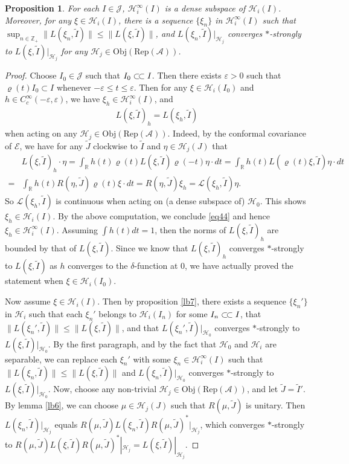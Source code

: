 \documentclass[11pt,b5paper,notitlepage]{article}
\theoremstyle{definition}
\theoremstyle{plain}
\newtheorem{pp}[df]{Proposition}
\newcommand{\mc}{\mathcal}
\newcommand{\wtd}{\widetilde}
\newcommand{\scr}{\mathscr}
\newcommand{\RepA}{\mathrm{Rep}(\mc A)}
\newcommand{\mbb}{\mathbb}
\newcommand{\Obj}{\mathrm{Obj}}
\numberwithin{equation}{subsection}
\begin{document}
\begin{pp}\label{lb8}
For each $I\in\mc J$, $\mc H_i^\infty(I)$ is a dense subspace of $\mc H_i(I)$. Moreover, for any $\xi\in\mc H_i(I)$, there is a sequence $\{\xi_n\}$ in $\mc H_i^\infty(I)$ such that $\sup_{n\in\mbb Z_+}\big\lVert  L(\xi_n,\wtd I) \big\lVert\leq\big\lVert  L(\xi,\wtd I) \big\lVert$,  and $L(\xi_n,\wtd I)|_{\mc H_j}$ converges $*$-strongly to $L(\xi,\wtd I)|_{\mc H_j}$ for any $\mc H_j\in\Obj(\RepA)$.
\end{pp}

\begin{proof}
Choose  $I_0\in\mc J$ such that $I_0\subset\joinrel\subset I$. Then there exists $\varepsilon>0$ such that $\varrho(t)I_0\subset I$ whenever $-\varepsilon\leq t\leq \varepsilon$. Then for any $\xi\in\mc H_i(I_0)$ and $h\in C_c^\infty(-\varepsilon,\varepsilon)$,  we have $\xi_h\in\mc H_i^\infty(I)$, and
\begin{align}
L(\xi,\wtd I)_h=L(\xi_h,\wtd I)\label{eq44}
\end{align}
when acting on any $\mc H_j\in\Obj(\RepA)$. Indeed, by the conformal covariance of $\scr E$, we have for any $\wtd J$ clockwise to $\wtd I$ and $\eta\in\mc H_j(J)$ that
\begin{align*}
&L(\xi,\wtd I)_h\cdot \eta=\int_{\mbb R}h(t)\varrho(t)L(\xi,\wtd I)\varrho(-t)\eta\cdot dt=\int_{\mbb R}h(t)L(\varrho(t)\xi,\wtd I)\eta\cdot dt\\
=&\int_{\mbb R}h(t)R(\eta,\wtd J)\varrho(t)\xi\cdot dt=R(\eta,\wtd J)\xi_h=\scr L(\xi_h,\wtd I)\eta.
\end{align*}
So $\scr L(\xi_h,\wtd I)$ is continuous when acting on (a dense subspace of) $\mc H_0$. This shows $\xi_h\in\mc H_i(I)$. By the above computation, we conclude \eqref{eq44} and hence $\xi_h\in\mc H_i^\infty(I)$. Assuming $\int h(t)dt=1$, then the norms of $L(\xi,\wtd I)_h$ are bounded by that of $L(\xi,\wtd I)$. Since we know that $L(\xi,\wtd I)_h$ converges $*$-strongly to $L(\xi,\wtd I)$ as $h$ converges to the $\delta$-function at $0$, we have actually proved the statement when $\xi\in\mc H_i(I_0)$.

Now assume $\xi\in\mc H_i(I)$. Then by proposition \ref{lb7}, there exists a sequence $\{\xi_n'\}$ in $\mc H_i$ such that each $\xi_n'$ belongs to $\mc H_i(I_n)$ for some $I_n\subset\joinrel\subset I$, that $\lVert L(\xi_n',\wtd I) \lVert\leq \lVert L(\xi,\wtd I) \lVert$, and that $L(\xi_n',\wtd I)|_{\mc H_0}$ converges $*$-strongly to $L(\xi,\wtd I)|_{\mc H_0}$. By the first paragraph,  and by the fact that $\mc H_0$ and $\mc H_i$ are separable, we can replace each $\xi_n'$ with some $\xi_n\in\mc H_i^\infty(I)$ such that $\lVert L(\xi_n,\wtd I) \lVert\leq \lVert L(\xi,\wtd I) \lVert$ and $L(\xi_n,\wtd I)|_{\mc H_0}$ converges $*$-strongly to $L(\xi,\wtd I)|_{\mc H_0}$. Now, choose any non-trivial $\mc H_j\in\Obj(\RepA)$, and let $\wtd J=\wtd I'$. By lemma \ref{lb6}, we can choose $\mu\in\mc H_j(J)$ such that $R(\mu,\wtd J)$ is unitary. Then $L(\xi_n,\wtd I)|_{\mc H_j}$ equals $R(\mu,\wtd J)L(\xi_n,\wtd I)R(\mu,\wtd J)^*|_{\mc H_j}$, which converges $*$-strongly to $R(\mu,\wtd J)L(\xi,\wtd I)R(\mu,\wtd J)^*|_{\mc H_j}=L(\xi,\wtd I)|_{\mc H_j}$.
\end{proof}	
\end{document}
